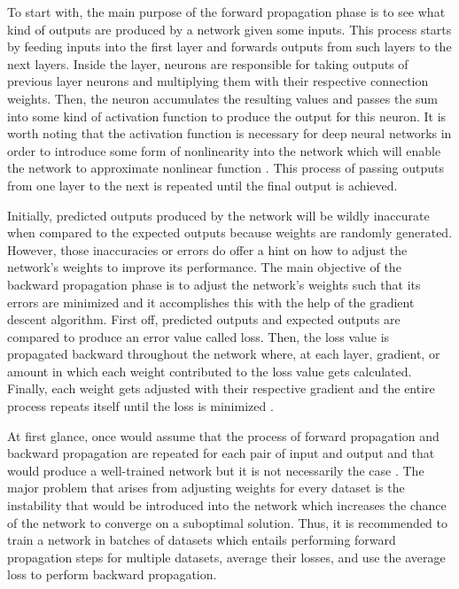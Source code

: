\documentclass{IEEEtran}
\begin{document}
        To start with, the main purpose of the forward propagation phase is to see what kind of outputs are produced by a network given some inputs. This process starts by feeding inputs into the first layer and forwards outputs from such layers to the next layers. Inside the layer, neurons are responsible for taking outputs of previous layer neurons and multiplying them with their respective connection weights. Then, the neuron accumulates the resulting values and passes the sum into some kind of activation function to produce the output for this neuron. It is worth noting that the activation function is necessary for deep neural networks in order to introduce some form of nonlinearity into the network which will enable the network to approximate nonlinear function \cite{luhaniwal_2020}. This process of passing outputs from one layer to the next is repeated until the final output is achieved.

        Initially, predicted outputs produced by the network will be wildly inaccurate when compared to the expected outputs because weights are randomly generated. However, those inaccuracies or errors do offer a hint on how to adjust the network’s weights to improve its performance. The main objective of the backward propagation phase is to adjust the network’s weights such that its errors are minimized and it accomplishes this with the help of the gradient descent algorithm. First off, predicted outputs and expected outputs are compared to produce an error value called loss. Then, the loss value is propagated backward throughout the network where, at each layer, gradient, or amount in which each weight contributed to the loss value gets calculated. Finally, each weight gets adjusted with their respective gradient and the entire process repeats itself until the loss is minimized \cite{kostadinov_2019}.

        At first glance, once would assume that the process of forward propagation and backward propagation are repeated for each pair of input and output and that would produce a well-trained network but it is not necessarily the case \cite{ruder2017overview}. The major problem that arises from adjusting weights for every dataset is the instability that would be introduced into the network which increases the chance of the network to converge on a suboptimal solution. Thus, it is recommended to train a network in batches of datasets which entails performing forward propagation steps for multiple datasets, average their losses, and use the average loss to perform backward propagation. 
\end{document}
